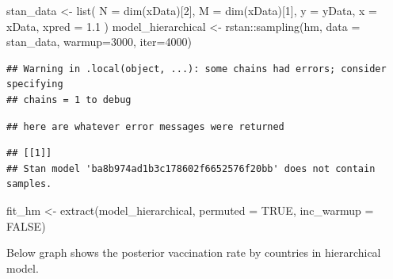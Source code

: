\documentclass[
]{article}
\newenvironment{Shaded}{\begin{snugshade}}{\end{snugshade}}
\newcommand{\AttributeTok}[1]{\textcolor[rgb]{0.77,0.63,0.00}{#1}}
\newcommand{\ConstantTok}[1]{\textcolor[rgb]{0.00,0.00,0.00}{#1}}
\newcommand{\DecValTok}[1]{\textcolor[rgb]{0.00,0.00,0.81}{#1}}
\newcommand{\FloatTok}[1]{\textcolor[rgb]{0.00,0.00,0.81}{#1}}
\newcommand{\FunctionTok}[1]{\textcolor[rgb]{0.00,0.00,0.00}{#1}}
\newcommand{\NormalTok}[1]{#1}
\newcommand{\OtherTok}[1]{\textcolor[rgb]{0.56,0.35,0.01}{#1}}
\newcommand{\SpecialCharTok}[1]{\textcolor[rgb]{0.00,0.00,0.00}{#1}}
\begin{document}
\begin{Shaded}
\begin{Highlighting}[]
\NormalTok{stan\_data }\OtherTok{\textless{}{-}} \FunctionTok{list}\NormalTok{(}
    \AttributeTok{N =} \FunctionTok{dim}\NormalTok{(xData)[}\DecValTok{2}\NormalTok{],}
    \AttributeTok{M =} \FunctionTok{dim}\NormalTok{(xData)[}\DecValTok{1}\NormalTok{],}
    \AttributeTok{y =}\NormalTok{ yData,}
    \AttributeTok{x =}\NormalTok{ xData,}
    \AttributeTok{xpred =} \FloatTok{1.1}
\NormalTok{)}
\NormalTok{model\_hierarchical }\OtherTok{\textless{}{-}}\NormalTok{ rstan}\SpecialCharTok{::}\FunctionTok{sampling}\NormalTok{(hm, }\AttributeTok{data =}\NormalTok{ stan\_data, }\AttributeTok{warmup=}\DecValTok{3000}\NormalTok{, }\AttributeTok{iter=}\DecValTok{4000}\NormalTok{)}
\end{Highlighting}
\end{Shaded}

\begin{verbatim}
## Warning in .local(object, ...): some chains had errors; consider specifying
## chains = 1 to debug
\end{verbatim}

\begin{verbatim}
## here are whatever error messages were returned
\end{verbatim}

\begin{verbatim}
## [[1]]
## Stan model 'ba8b974ad1b3c178602f6652576f20bb' does not contain samples.
\end{verbatim}

\begin{Shaded}
\begin{Highlighting}[]
\NormalTok{fit\_hm }\OtherTok{\textless{}{-}} \FunctionTok{extract}\NormalTok{(model\_hierarchical, }\AttributeTok{permuted =} \ConstantTok{TRUE}\NormalTok{, }\AttributeTok{inc\_warmup =} \ConstantTok{FALSE}\NormalTok{)}
\end{Highlighting}
\end{Shaded}

Below graph shows the posterior vaccination rate by countries in
hierarchical model.
\end{document}
